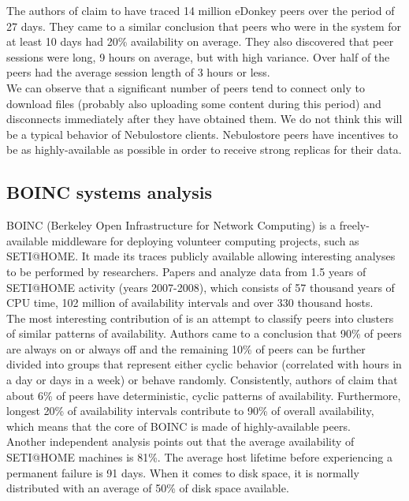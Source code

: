 \documentclass{pracamgren}
\begin{document}
The authors of \cite{edonkey} claim to have traced 14 million eDonkey peers over the period of 27 days. They came to a similar conclusion that peers who were in the system for at least 10 days had 20\% availability on average. They also discovered that peer sessions were long, 9 hours on average, but with high variance. Over half of the peers had the average session length of 3 hours or less.\\

We can observe that a significant number of peers tend to connect only to download files (probably also uploading some content during this period) and disconnects immediately after they have obtained them. We do not think this will be a typical behavior of Nebulostore clients. Nebulostore peers have incentives to be as highly-available as possible in order to receive strong replicas for their data.\\

\subsection{BOINC systems analysis}

BOINC (Berkeley Open Infrastructure for Network Computing) is a freely-available middleware for deploying volunteer computing projects, such as SETI@HOME. It made its traces publicly available allowing interesting analyses to be performed by researchers. Papers \cite{availability} and \cite{seti} analyze data from 1.5 years of SETI@HOME activity (years 2007-2008), which consists of 57 thousand years of CPU time, 102 million of availability intervals and over 330 thousand hosts.\\

The most interesting contribution of \cite{availability} is an attempt to classify peers into clusters of similar patterns of availability. Authors came to a conclusion that 90\% of peers are always on or always off and the remaining 10\% of peers can be further divided into groups that represent either cyclic behavior (correlated with hours in a day or days in a week) or behave randomly. Consistently, authors of \cite{seti} claim that about 6\% of peers have deterministic, cyclic patterns of availability. Furthermore, longest 20\% of availability intervals contribute to 90\% of overall availability, which means that the core of BOINC is made of highly-available peers.\\

Another independent analysis \cite{storage} points out that the average availability of SETI@HOME machines is 81\%. The average host lifetime before experiencing a permanent failure is 91 days. When it comes to disk space, it is normally distributed with an average of 50\% of disk space available.\\
\end{document}
